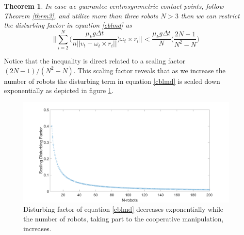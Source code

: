 \documentclass[letterpaper, 10 pt, conference]{ieeeconf}
\newtheorem{theorem}{\textbf{Theorem}}
\begin{document}
\begin{theorem}\label{thrm4}
\textit{In case we guarantee centrosymmetric contact points, follow Theorem \ref{thrm3}, and utilize more than three robots  $N>3$ then we can restrict the disturbing factor in equation \ref{cblmd} as
\begin{equation}
\Bigg| \Bigg| \sum_{i=2}^N \Bigg( \frac{\mu_k g \Delta t}{n||v_t+ \omega_t \times r_i||} \Bigg)\omega_t \times r_i \Bigg| \Bigg|< \frac{\mu_k g \Delta t}{N} \Bigg( \frac{2N-1}{N^2-N} \Bigg)
\end{equation}
} \vspace{.2cm}
\end{theorem}
Notice that the inequality is direct related to a scaling factor $(2N-1)/(N^2-N)$. This scaling factor reveals that as we increase the number of robots the disturbing term in equation \ref{cblmd} is scaled down exponentially as depicted in figure \ref{scaling}.
\begin{figure}[!h]
	\includegraphics[width=.53\textwidth]{figures/scalingFactorDisturbance.png}
	\centering
	\caption{Disturbing factor of equation \ref{cblmd} decreases exponentially while the number of robots, taking part to the cooperative manipulation, increases.}
	\label{scaling}
\end{figure}
\end{document}
